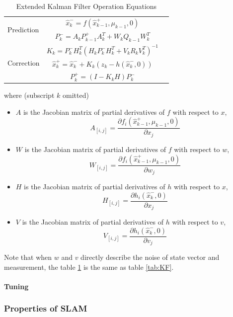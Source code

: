 \begin{table}[H]
\caption{Extended Kalman Filter Operation Equations}
\label{tab:EKF}
\centering
\begin{tabular}{|l|c r|}
\hline
\multirow{2}{*}{Prediction} 
& $\hat{x}^-_k=f(\hat{x}^+_{k-1},\mu_{k-1},0)$ & \stepcounter{equation}\tetab{\theequation}\\
& $P^-_k = A_kP^+_{k-1}A_k^T+W_kQ_{k-1}W_k^T$ & \stepcounter{equation}\tetab{\theequation}\\
\hline
\multirow{3}{*}{Correction}
& $K_k=P^-_kH_k^T(H_kP^-_kH_k^T+V_kR_kV_k^T)^{-1}$  & \stepcounter{equation}\tetab{\theequation}\\
& $\hat{x}^+_k = \hat{x}^-_k+K_k(z_k-h(\hat{x}^-_k,0))$ & \stepcounter{equation}\tetab{\theequation}\\
& $P^+_k = (I-K_kH)P^-_k$ & \stepcounter{equation}\tetab{\theequation}\\
\hline
\end{tabular}
\end{table}
\FloatBarrier
\noindent where (subscript $k$ omitted)
\begin{itemize}
  \item $A$ is the Jacobian matrix of partial derivatives of $f$ with
  respect to $x$, $$A_{[i,j]}= \frac{\partial f_i(\hat{x}_{k-1}^+, \mu_{k-1},
    0)}{\partial x_j}$$
  \item $W$ is the Jacobian matrix of partial derivatives of $f$ with
  respect to $w$, $$W_{[i,j]}= \frac{\partial f_i(\hat{x}_{k-1}^+, \mu_{k-1},
    0)}{\partial w_j}$$
  \item $H$ is the Jacobian matrix of partial derivatives of $h$ with
  respect to $x$, $$H_{[i,j]}= \frac{\partial h_i(\hat{x}_k^-, 0)}{\partial x_j}$$
  \item $V$ is the Jacobian matrix of partial derivatives of $h$ with
  respect to $v$, $$V_{[i,j]}= \frac{\partial h_i(\hat{x}_k^-,0)}{\partial v_j}$$
\end{itemize}

\noindent Note that when $w$ and $v$ directly describe the noise of
state vector and measurement, the table \ref{tab:EKF} is the same as
table \ref{tab:KF}. 

\paragraph{Tuning}

\subsubsection{Properties of SLAM}
\label{sec:SLAM_properties}

